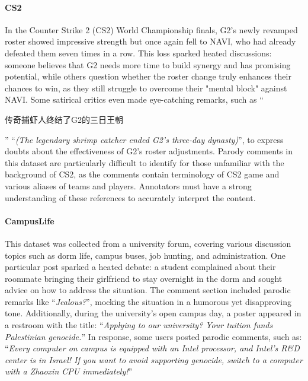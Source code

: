 \paragraph{CS2} In the Counter Strike 2 (CS2) World Championship finals, G2's newly revamped roster showed impressive strength but once again fell to NAVI, who had already defeated them seven times in a row. This loss sparked heated discussions: someone believes that G2 needs more time to build synergy and has promising potential, while others question whether the roster change truly enhances their chances to win, as they still struggle to overcome their "mental block" against NAVI. Some satirical critics even made eye-catching remarks, such as ``\begin{CJK}{UTF8}{gbsn}传奇捕虾人终结了G2的三日王朝\end{CJK}'' ``\textit{(The legendary shrimp catcher ended G2's three-day dynasty)}'', to express doubts about the effectiveness of G2's roster adjustments. Parody comments in this dataset are particularly difficult to identify for those unfamiliar with the background of CS2, as the comments contain terminology of CS2 game and various aliases of teams and players. Annotators must have a strong understanding of these references to accurately interpret the content.

\paragraph{CampusLife} This dataset was collected from a university forum, covering various discussion topics such as dorm life, campus buses, job hunting, and administration. One particular post sparked a heated debate: a student complained about their roommate bringing their girlfriend to stay overnight in the dorm and sought advice on how to address the situation. The comment section included parodic remarks like ``\textit{Jealous?}'', mocking the situation in a humorous yet disapproving tone. Additionally, during the university's open campus day, a poster appeared in a restroom with the title: ``\textit{Applying to our university? Your tuition funds Palestinian genocide.}'' In response, some users posted parodic comments, such as: ``\textit{Every computer on campus is equipped with an Intel processor, and Intel's R\&D center is in Israel! If you want to avoid supporting genocide, switch to a computer with a Zhaoxin CPU immediately!}''


